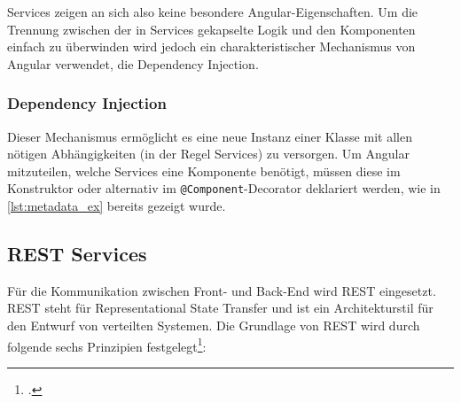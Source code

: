 Services zeigen an sich also keine besondere Angular-Eigenschaften. Um die Trennung zwischen der in Services gekapselte Logik und den Komponenten einfach zu überwinden wird jedoch ein charakteristischer Mechanismus von Angular verwendet, die Dependency Injection. 

\subsubsection{Dependency Injection}
Dieser Mechanismus ermöglicht es eine neue Instanz einer Klasse mit allen nötigen Abhängigkeiten (in der Regel Services) zu versorgen. Um Angular mitzuteilen, welche Services eine Komponente benötigt, müssen diese im Konstruktor oder alternativ im \texttt{@Component}-Decorator deklariert werden, wie in \cref{lst:metadata_ex} bereits gezeigt wurde.

\subsection{REST Services}
Für die Kommunikation zwischen Front- und Back-End wird REST eingesetzt. REST steht für Representational State Transfer und ist ein Architekturstil für den Entwurf von verteilten Systemen. Die Grundlage von REST wird durch folgende sechs Prinzipien festgelegt\footcite[Vgl.][S. 1-3]{Varanasi2015}:

